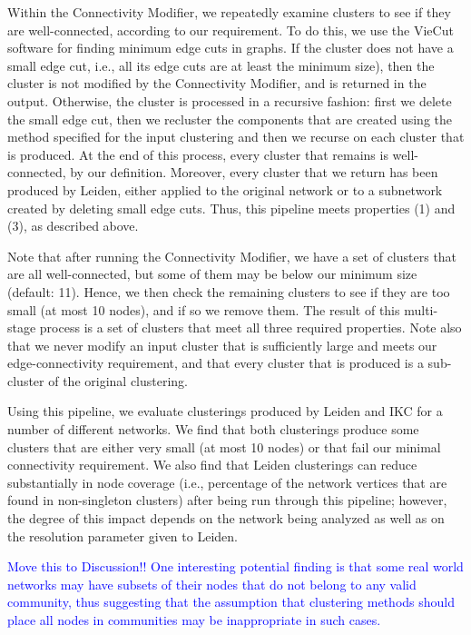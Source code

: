 \documentclass[11pt]{article}   	%
\begin{document}
Within the Connectivity Modifier, we repeatedly examine clusters to see if they are well-connected, according to our requirement.
To do this, we use the VieCut \citep{Henzinger2018,Henzinger2019}  software for finding minimum edge cuts in graphs.
If the cluster does not have a small edge cut, i.e., all its edge cuts are at least the minimum size), then the cluster is not modified by the Connectivity Modifier, 
and is returned in the output.
Otherwise, the cluster is processed in a recursive fashion: first we delete the small edge cut, then we recluster the components that are created using the method specified for the input clustering
and then we recurse on each cluster that is produced. At the end of this process, every cluster that remains is well-connected, by our definition. 
Moreover, every cluster that we return has been produced by Leiden, either applied to the original network or to a subnetwork created by deleting small edge cuts.
Thus, this pipeline meets properties (1) and (3), as  described above.

Note that after running the Connectivity Modifier, we have a set of clusters that are all well-connected, but some of them may be below our minimum size (default: 11).
Hence, we then check the remaining clusters to see if they are too small (at most 10 nodes), and if so we remove them.
The result of this multi-stage process is a set of clusters that meet all three required properties. 
Note also that we never modify an input cluster that is sufficiently large
and meets our edge-connectivity requirement, and that every cluster that is produced is a sub-cluster of the original clustering. 

Using this pipeline, we evaluate clusterings produced by Leiden and IKC for a number of different networks. 
We find that both clusterings produce  some clusters that are either very 
small (at most 10 nodes) or that fail our minimal connectivity requirement. 
We also find that Leiden clusterings can reduce substantially  in node coverage (i.e., percentage of the network vertices that are found in non-singleton
clusters)  after being run through this pipeline;
however, the degree of this impact depends on the network being analyzed as well as on the resolution 
parameter given to Leiden. 

\textcolor{blue}{Move this to Discussion!! One interesting potential finding is that some real world networks may have subsets of their nodes that do not belong to any valid community,
thus suggesting that the assumption that clustering methods should place all nodes in communities  may be inappropriate in such cases.}
\end{document}
